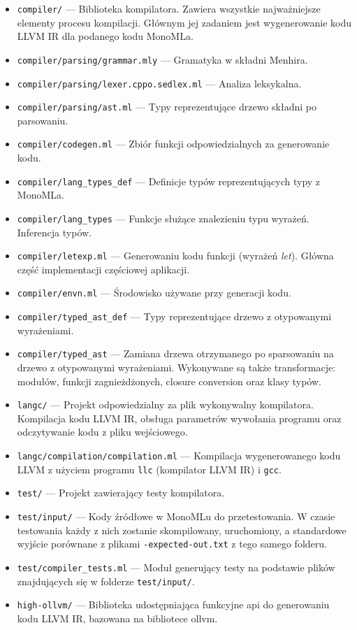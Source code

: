 \documentclass[declaration,shortabstract]{iithesis}
\begin{document}
\begin{itemize}
  \item \texttt{compiler/} --- Biblioteka kompilatora. Zawiera wszystkie 
  najważniejsze elementy procesu kompilacji. Głównym jej zadaniem jest 
  wygenerowanie kodu LLVM IR dla podanego kodu MonoMLa.
  \item \texttt{compiler/parsing/grammar.mly} --- Gramatyka w składni Menhira.
  \item \texttt{compiler/parsing/lexer.cppo.sedlex.ml} --- Analiza leksykalna.
  \item \texttt{compiler/parsing/ast.ml} --- Typy reprezentujące drzewo składni 
  po parsowaniu.
  \item \texttt{compiler/codegen.ml} --- Zbiór funkcji odpowiedzialnych za 
  generowanie kodu.
  \item \texttt{compiler/lang\_types\_def} --- Definicje typów reprezentujących 
  typy z MonoMLa.
  \item \texttt{compiler/lang\_types} --- Funkcje służące znalezieniu
  typu wyrażeń. Inferencja typów.
  \item \texttt{compiler/letexp.ml} --- Generowaniu kodu funkcji 
  (wyrażeń \textit{let}). 
  Główna część implementacji częściowej aplikacji.
  \item \texttt{compiler/envn.ml} --- Środowisko używane przy 
  generacji kodu.
  \item \texttt{compiler/typed\_ast\_def} --- Typy reprezentujące drzewo 
  z otypowanymi wyrażeniami.
  \item \texttt{compiler/typed\_ast} --- Zamiana drzewa otrzymanego po 
  sparsowaniu na drzewo z otypowanymi wyrażeniami. Wykonywane są także 
  transformacje: modułów, funkcji zagnieżdżonych, closure conversion
  oraz klasy typów.
  \item \texttt{langc/} --- Projekt odpowiedzialny za plik wykonywalny 
  kompilatora. Kompilacja kodu LLVM IR, obsługa parametrów wywołania programu
  oraz odczytywanie kodu z pliku wejściowego.
  \item \texttt{langc/compilation/compilation.ml} --- Kompilacja wygenerowanego 
  kodu LLVM z użyciem programu \texttt{llc} (kompilator LLVM IR) i 
  \texttt{gcc}.
  \item \texttt{test/} --- Projekt zawierający testy kompilatora.
  \item \texttt{test/input/} --- Kody źródłowe w MonoMLu do przetestowania. W czasie 
  testowania każdy z nich zostanie skompilowany, uruchomiony, a standardowe
  wyjście porównane z plikami \texttt{-expected-out.txt} z tego samego folderu.
  \item \texttt{test/compiler\_tests.ml} --- Moduł generujący testy na podstawie 
  plików znajdujących się w folderze \texttt{test/input/}.
  \item \texttt{high-ollvm/} --- Biblioteka udostępniająca funkcyjne api do 
  generowaniu kodu LLVM IR, bazowana na bibliotece ollvm\cite{ollvm}.

\end{itemize}
\end{document}
